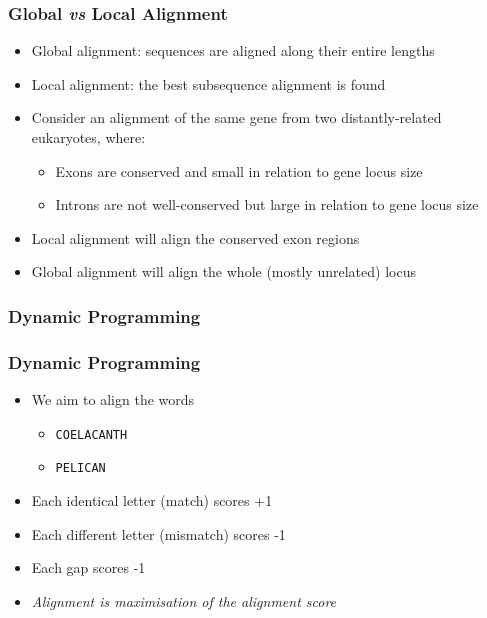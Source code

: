 \documentclass[table]{beamer}
\begin{document}
    \begin{frame}
     \frametitle{Global \textit{vs} Local Alignment}
     \begin{itemize}
       \item<1-> Global alignment: sequences are aligned along their entire lengths
       \item<1-> Local alignment: the best subsequence alignment is found
       \item<2-> Consider an alignment of the same gene from two distantly-related eukaryotes, where:
         \begin{itemize}
           \item<2-> Exons are conserved and small in relation to gene locus size
           \item<2-> Introns are not well-conserved but large in relation to gene locus size
         \end{itemize}
       \item<3-> Local alignment will align the conserved exon regions
       \item<3-> Global alignment will align the whole (mostly unrelated) locus
     \end{itemize}
    \end{frame}

	\subsubsection{Dynamic Programming}
    \begin{frame}
     \frametitle{Dynamic Programming}
     \begin{itemize}
       \item<1-> We aim to align the words
       \begin{itemize}
         \item<1-> \texttt{COELACANTH}
         \item<1-> \texttt{PELICAN}
       \end{itemize}
       \item<2-> Each identical letter (match) scores +1
       \item<2-> Each different letter (mismatch) scores -1
       \item<2-> Each gap scores -1
       \item<3-> \emph{Alignment is maximisation of the alignment score}
     \end{itemize}
    \end{frame}   
   
\end{document}
